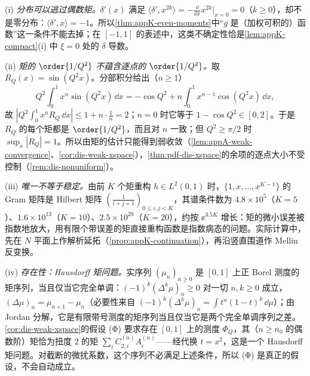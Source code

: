 \begin{remark}[反例与稳定性]\label{rem:appK-counterexamples}
(i) \emph{分布可以逃过偶数矩。}$\delta'(x)$ 满足 $\langle\delta',x^{2k}\rangle=-\frac{\dd}{\dd x}x^{2k}\big|_{x=0}=0$（$k\ge0$），却不是零分布：$\langle\delta',x\rangle=-1$。所以\cref{thm:appK-even-moments}中“$g$ 是（加权可积的）函数”这一条件不能去掉；在 $[-1,1]$ 的表述中，这类不确定性恰是\cref{lem:appK-compact}(i) 中 $\xi=0$ 处的 $\delta$ 导数。

(ii) \emph{矩的 $\order{1/Q^2}$ 不蕴含逐点的 $\order{1/Q^2}$。}取 $R_Q(x)=\sin(Q^2x)$。分部积分给出（$n\ge1$）
\[
Q^2\int_0^1x^n\sin(Q^2x)\,\dd x=-\cos Q^2+n\int_0^1x^{n-1}\cos(Q^2x)\,\dd x ,
\]
故 $|Q^2\int_0^1x^nR_Q\,\dd x|\le1+n\cdot\frac1n=2$；$n=0$ 时它等于 $1-\cos Q^2\in[0,2]$。于是 $R_Q$ 的每个矩都是 $\order{1/Q^2}$，而且对 $n$ 一致；但 $Q^2\ge\pi/2$ 时 $\sup_x|R_Q|=1$。所以由矩的估计只能得到弱收敛（\cref{lem:appA-weak-convergence}、\cref{cor:dis-weak-xspace}），\cref{thm:pdf-dis-xspace}的余项的逐点大小不受控制（\cref{rem:dis-nonuniform}）。

(iii) \emph{唯一不等于稳定。}由前 $K$ 个矩重构 $h\in L^2(0,1)$ 时，$\{1,x,\dots,x^{K-1}\}$ 的 Gram 矩阵是 Hilbert 矩阵 $(\frac1{i+j+1})_{0\le i,j<K}$，其谱条件数为 $4.8\times10^5$（$K=5$）、$1.6\times10^{13}$（$K=10$）、$2.5\times10^{28}$（$K=20$），约按 $\ee^{3.5K}$ 增长：矩的微小误差被指数地放大，用有限个带误差的矩直接重构函数是指数病态的问题。实际计算中，先在 $N$ 平面上作解析延拓（\cref{prop:appK-continuation}），再沿竖直围道作 Mellin 反变换。

(iv) \emph{存在性：Hausdorff 矩问题。}实序列 $(\mu_n)_{n\ge0}$ 是 $[0,1]$ 上正 Borel 测度的矩序列，当且仅当它完全单调：$(-1)^k(\Delta^k\mu)_n\ge0$ 对一切 $n,k\ge0$ 成立，$(\Delta\mu)_n=\mu_{n+1}-\mu_n$\cite{Hausdorff1921a,Hausdorff1921b}（必要性来自 $(-1)^k(\Delta^k\mu)_n=\int t^n(1-t)^k\,\dd\mu$）；由 Jordan 分解，它是有限带号测度的矩序列当且仅当它是两个完全单调序列之差。\cref{cor:dis-weak-xspace}的假设 (Φ) 要求存在 $[0,1]$ 上的测度 $\Phi_Q$，其（$n\ge n_0$ 的偶数阶）矩恰为扭度 2 的矩 $\sum_iC^{(n)}_{2,i}A^{(n)}_i$——经代换 $t=x^2$，这是一个 Hausdorff 矩问题。对截断的微扰系数，这个序列不必满足上述条件，所以 (Φ) 是真正的假设，不会自动成立。
\end{remark}
